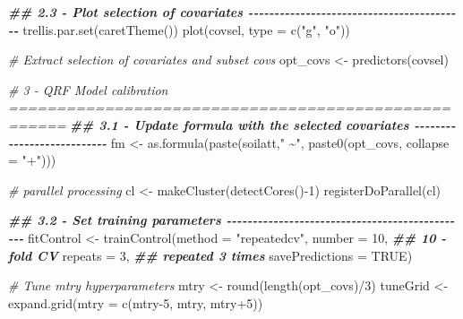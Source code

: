 \documentclass[
  10pt,
  b5paper,
  oneside]{book}
\newenvironment{Shaded}{\begin{snugshade}}{\end{snugshade}}
\newcommand{\AttributeTok}[1]{\textcolor[rgb]{0.77,0.63,0.00}{#1}}
\newcommand{\CommentTok}[1]{\textcolor[rgb]{0.56,0.35,0.01}{\textit{#1}}}
\newcommand{\ConstantTok}[1]{\textcolor[rgb]{0.00,0.00,0.00}{#1}}
\newcommand{\DecValTok}[1]{\textcolor[rgb]{0.00,0.00,0.81}{#1}}
\newcommand{\DocumentationTok}[1]{\textcolor[rgb]{0.56,0.35,0.01}{\textbf{\textit{#1}}}}
\newcommand{\FunctionTok}[1]{\textcolor[rgb]{0.00,0.00,0.00}{#1}}
\newcommand{\NormalTok}[1]{#1}
\newcommand{\OtherTok}[1]{\textcolor[rgb]{0.56,0.35,0.01}{#1}}
\newcommand{\SpecialCharTok}[1]{\textcolor[rgb]{0.00,0.00,0.00}{#1}}
\newcommand{\StringTok}[1]{\textcolor[rgb]{0.31,0.60,0.02}{#1}}
\begin{document}
\begin{Shaded}
\begin{Highlighting}[]
\DocumentationTok{\#\# 2.3 {-} Plot selection of covariates {-}{-}{-}{-}{-}{-}{-}{-}{-}{-}{-}{-}{-}{-}{-}{-}{-}{-}{-}{-}{-}{-}{-}{-}{-}{-}{-}{-}{-}{-}{-}{-}{-}{-}{-}{-}{-}{-}{-}{-}{-}{-}}
\FunctionTok{trellis.par.set}\NormalTok{(}\FunctionTok{caretTheme}\NormalTok{())}
\FunctionTok{plot}\NormalTok{(covsel, }\AttributeTok{type =} \FunctionTok{c}\NormalTok{(}\StringTok{"g"}\NormalTok{, }\StringTok{"o"}\NormalTok{))}

\CommentTok{\# Extract selection of covariates and subset covs}
\NormalTok{opt\_covs }\OtherTok{\textless{}{-}} \FunctionTok{predictors}\NormalTok{(covsel)}

\CommentTok{\# 3 {-} QRF Model calibration ====================================================}
\DocumentationTok{\#\# 3.1 {-} Update formula with the selected covariates {-}{-}{-}{-}{-}{-}{-}{-}{-}{-}{-}{-}{-}{-}{-}{-}{-}{-}{-}{-}{-}{-}{-}{-}{-}{-}{-}}
\NormalTok{fm }\OtherTok{\textless{}{-}} \FunctionTok{as.formula}\NormalTok{(}\FunctionTok{paste}\NormalTok{(soilatt,}\StringTok{" \textasciitilde{}"}\NormalTok{, }\FunctionTok{paste0}\NormalTok{(opt\_covs, }\AttributeTok{collapse =} \StringTok{"+"}\NormalTok{)))}

\CommentTok{\# parallel processing}
\NormalTok{cl }\OtherTok{\textless{}{-}} \FunctionTok{makeCluster}\NormalTok{(}\FunctionTok{detectCores}\NormalTok{()}\SpecialCharTok{{-}}\DecValTok{1}\NormalTok{)}
\FunctionTok{registerDoParallel}\NormalTok{(cl)}

\DocumentationTok{\#\# 3.2 {-} Set training parameters {-}{-}{-}{-}{-}{-}{-}{-}{-}{-}{-}{-}{-}{-}{-}{-}{-}{-}{-}{-}{-}{-}{-}{-}{-}{-}{-}{-}{-}{-}{-}{-}{-}{-}{-}{-}{-}{-}{-}{-}{-}{-}{-}{-}{-}{-}{-}}
\NormalTok{fitControl }\OtherTok{\textless{}{-}} \FunctionTok{trainControl}\NormalTok{(}\AttributeTok{method =} \StringTok{"repeatedcv"}\NormalTok{,}
                           \AttributeTok{number =} \DecValTok{10}\NormalTok{,         }\DocumentationTok{\#\# 10 {-}fold CV}
                           \AttributeTok{repeats =} \DecValTok{3}\NormalTok{,        }\DocumentationTok{\#\# repeated 3 times}
                           \AttributeTok{savePredictions =} \ConstantTok{TRUE}\NormalTok{)}

\CommentTok{\# Tune mtry hyperparameters}
\NormalTok{mtry }\OtherTok{\textless{}{-}} \FunctionTok{round}\NormalTok{(}\FunctionTok{length}\NormalTok{(opt\_covs)}\SpecialCharTok{/}\DecValTok{3}\NormalTok{)}
\NormalTok{tuneGrid }\OtherTok{\textless{}{-}}  \FunctionTok{expand.grid}\NormalTok{(}\AttributeTok{mtry =} \FunctionTok{c}\NormalTok{(mtry}\DecValTok{{-}5}\NormalTok{, mtry, mtry}\SpecialCharTok{+}\DecValTok{5}\NormalTok{))}


\end{Highlighting}
\end{Shaded}
\end{document}
